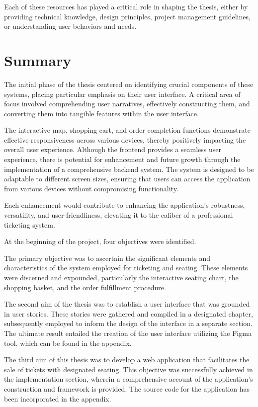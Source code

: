 Each of these resources has played a critical role in shaping the thesis, either by providing technical knowledge, design principles, project management guidelines, or understanding user behaviors and needs.

\section*{Summary}
\label{sec:summary}
The initial phase of the thesis centered on identifying crucial components of these systems, placing particular emphasis on their user interface.
A critical area of focus involved comprehending user narratives, effectively constructing them, and converting them into tangible features within the user interface.

The interactive map, shopping cart, and order completion functions demonstrate effective responsiveness across various devices, thereby positively impacting the overall user experience.
Although the frontend provides a seamless user experience, there is potential for enhancement and future growth through the implementation of a comprehensive backend system.
The system is designed to be adaptable to different screen sizes, ensuring that users can access the application from various devices without compromising functionality.

Each enhancement would contribute to enhancing the application's robustness, versatility, and user-friendliness, elevating it to the caliber of a professional ticketing system.

At the beginning of the project, four objectives were identified.

The primary objective was to ascertain the significant elements and characteristics of the system employed for ticketing and seating.
These elements were discerned and expounded, particularly the interactive seating chart, the shopping basket, and the order fulfillment procedure.

The second aim of the thesis was to establish a user interface that was grounded in user stories.
These stories were gathered and compiled in a designated chapter, subsequently employed to inform the design of the interface in a separate section.
The ultimate result entailed the creation of the user interface utilizing the Figma tool, which can be found in the appendix.

The third aim of this thesis was to develop a web application that facilitates the sale of tickets with designated seating.
This objective was successfully achieved in the implementation section, wherein a comprehensive account of the application's construction and framework is provided.
The source code for the application has been incorporated in the appendix.

